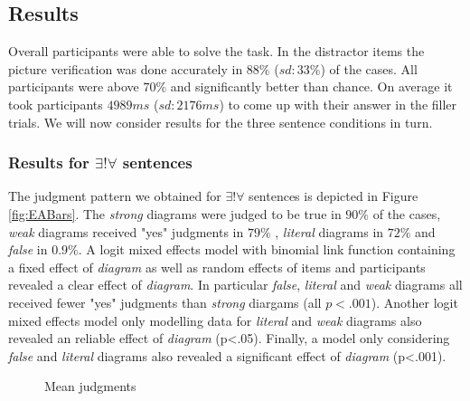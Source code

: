 \documentclass[a4paper,10pt]{article}
\begin{document}
\subsection{Results}

Overall participants were able to solve the task. In the distractor items the picture verification was done accurately in $88\%$ ($sd: 33\%$) of the cases. All participants were above $70\%$ and significantly better than chance. On average it took participants $4989ms$ ($sd:2176ms$) to come up with their answer in the filler trials. We will now consider results for the three sentence conditions in turn.

\subsubsection{Results for $\exists! \forall$ sentences}
The judgment pattern we obtained for $\exists! \forall$ sentences is depicted in Figure \ref{fig:EABars}. The {\it strong} diagrams were judged to be true in $90\%$ of the cases, {\it weak} diagrams received "yes" judgments in $79\%$ , {\it literal} diagrams in  $72\%$  and {\it false} in $0.9\%$.  A logit mixed effects model with binomial link function containing a fixed effect of {\it diagram} as well as random effects of items and participants revealed a clear effect of {\it diagram}. In particular {\it false}, {\it literal} and {\it weak} diagrams all received fewer "yes" judgments than {\it strong} diargams (all $p<.001$).  Another logit mixed effects model only modelling data for {\it literal} and {\it weak} diagrams also revealed an reliable effect of {\it diagram} (p<.05). Finally, a model only considering  {\it false} and {\it literal} diagrams also revealed a significant effect of {\it diagram} (p<.001).

\begin{figure}[ht]
\centering
{}
\caption[Optional caption for list of figures]{Mean judgments}
\label{fig:Bars}
\end{figure}
\end{document}
